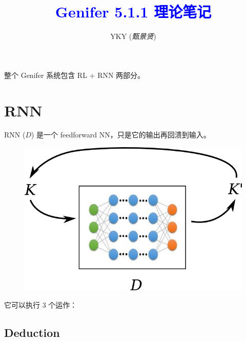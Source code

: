 \documentclass[12pt]{article}
\title{\textcolor{blue}{Genifer 5.1.1 理论笔记}}
\author{YKY (\textit{甄景贤})}
\newcommand{\tab}{\hspace*{1cm}}
\begin{document}

{\let\newpage\relax\maketitle}

\maketitle
\setlength{\parindent}{0em}
\setlength{\parskip}{1.5ex plus0.5ex minus1.2ex}

整个 Genifer 系统包含 RL + RNN 两部分。

\section{RNN}

RNN ($D$) 是一个 feedforward NN，只是它的输出再回溃到输入。

\begin{figure}[H]
\centering
\includegraphics[scale=0.75]{reasoner-model.png}
\end{figure}

它可以执行 3 个运作：

\subsection{Deduction}
\end{document}
